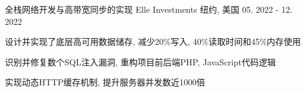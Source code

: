 \begin{cventries}
  \cventry
    {全栈网络开发与高带宽同步的实现}
    {Elle Investments}
    {纽约, 美国}
    {05. 2022 - 12. 2022}
    {
      \begin{cvitems}
          \item {设计并实现了底层高可用数据储存, 减少20\%写入, 40\%读取时间和45\%内存使用}
          \item {识别并修复数个SQL注入漏洞, 重构项目前后端PHP, JavaScript代码逻辑}
          \item {实现动态HTTP缓存机制, 提升服务器并发数近1000倍}
      \end{cvitems}
    }
  \begin{comment}
  \cventry
    {量子机器学习}
    {IBM Qiskit 量子计算}
    {远程}
    {07. 2021 - 08. 2021}
    {
      \begin{cvitems}
        \item {实现并在真实数据集运行QAOA, VQE等算法}
        \item {分析并研究Quantum Boltzmann Machines等量子算法在机器学习领域的运用}
      \end{cvitems}
    }


  \cventry
    {基于利率曲线的时间策略, 论文第二作者}
    {Fama-French因子和商业周期的分析}
    {远程}
    {06. 2021 - 12. 2021}
    {
      \begin{cvitems}
        \item {由麻省理工学院的Arnav Sheth教授指导}
        \item {实现了一个基于probit的经济周期预测模型, 获得70\%准确率, 并获得10\%年化收益}
        \item {通过Fama-French因子分析经济周期, 在ex post和ex ante数据集下印证模型收益}
      \end{cvitems}
    }
  
  \cventry
  {Full-stack development for an event-driven quantitative trading simulation}
  {Quantitative trading PaaS}
  {Remote}
  {Sep. 2020 - PRESENT}
  {
    \begin{cvitems}
      \item {Implemented benchmark tools based upon ARIMA and Prophet}
      \item {Designed UI\&UX with quantified alpha/beta testing, improving user experience}
      \item {Proposed low latency APIs that allow high frequency trading via HTTP}
    \end{cvitems}
  }
  

\end{comment}
\end{cventries}
